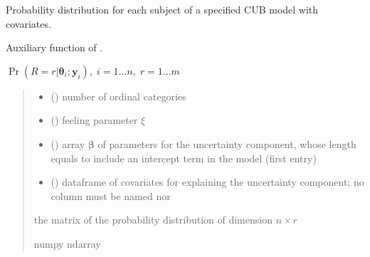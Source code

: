 \documentclass[letterpaper,10pt,english]{sphinxmanual}
\begin{document}

\begin{fulllineitems}
\label{\detokenize{cubmods:cubmods.cub_y0.pmfi}}
\pysigstartsignatures
{}
\pysigstopsignatures
\sphinxAtStartPar
Probability distribution for each subject of a specified CUB model 
with covariates.

\sphinxAtStartPar
Auxiliary function of .

\sphinxAtStartPar
\(\Pr(R = r | \pmb\theta_i ; \pmb y_i),\; i=1 \ldots n ,\; r=1 \ldots m\)
\begin{quote}\begin{description}
\begin{itemize}
\item {} 
\sphinxAtStartPar
{} () \textendash{} number of ordinal categories

\item {} 
\sphinxAtStartPar
{} () \textendash{} feeling parameter \(\xi\)

\item {} 
\sphinxAtStartPar
{} () \textendash{} array \(\pmb \beta\) of parameters for the uncertainty component, whose length equals 
 to include an intercept term in the model (first entry)

\item {} 
\sphinxAtStartPar
{} () \textendash{} dataframe of covariates for explaining the uncertainty component;
no column must be named  nor 

\end{itemize}

\sphinxAtStartPar
the matrix of the probability distribution of dimension \(n \times r\)

\sphinxAtStartPar
numpy ndarray

\end{description}\end{quote}

\end{fulllineitems}
\end{document}
